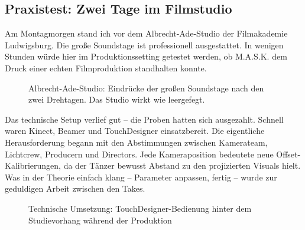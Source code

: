 \subsection{Praxistest: Zwei Tage im Filmstudio}

Am Montagmorgen stand ich vor dem Albrecht-Ade-Studio der Filmakademie Ludwigsburg. Die große Soundstage ist professionell ausgestattet. In wenigen Stunden würde hier im Produktionssetting getestet werden, ob M.A.S.K. dem Druck einer echten Filmproduktion standhalten konnte.

\begin{figure}[htbp]
    \centering
    \caption{Albrecht-Ade-Studio: Eindrücke der großen Soundstage nach den zwei Drehtagen. Das Studio wirkt wie leergefegt.}
    \label{fig:studio_interior}
\end{figure}


Das technische Setup verlief gut – die Proben hatten sich ausgezahlt. Schnell waren Kinect, Beamer und TouchDesigner einsatzbereit. Die eigentliche Herausforderung begann mit den Abstimmungen zwischen Kamerateam, Lichtcrew, Producern und Directors. Jede Kameraposition bedeutete neue Offset-Kalibrierungen, da der Tänzer bewusst Abstand zu den projizierten Visuals hielt. Was in der Theorie einfach klang – Parameter anpassen, fertig – wurde zur geduldigen Arbeit zwischen den Takes.

\begin{figure}[htbp]
    \centering
    \caption{Technische Umsetzung: TouchDesigner-Bedienung hinter dem Studievorhang während der Produktion}
    \label{fig:technical_operation}
\end{figure}


